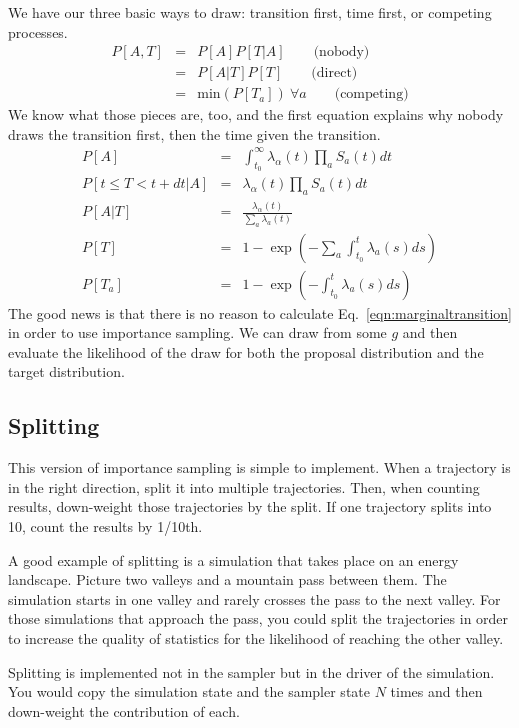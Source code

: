 \documentclass{article}
\begin{document}
We have our three basic ways to draw: transition first, time first, or competing processes.
\begin{eqnarray}
	P[A,T]&=&P[A]P[T|A]\qquad\mbox{(nobody)} \\
	&=&P[A|T]P[T]\qquad\mbox{(direct)}\\
	&=&\mbox{min}(P[T_a])\ \forall a\qquad\mbox{(competing)}
\end{eqnarray}
We know what those pieces are, too, and the first equation explains why nobody draws the transition first, then the time given the transition.
\begin{eqnarray}
	P[A] & = & \int_{t_0}^\infty \lambda_{\alpha}(t)\prod_{a}S_a(t)dt\label{eqn:marginaltransition} \\
	P[t\le T<t+dt|A] & = & \lambda_{\alpha}(t)\prod_{a}S_a(t)dt \\
	P[A|T] & = & \frac{\lambda_\alpha(t)}{\sum_a\lambda_a(t)} \\
	P[T] & = & 1-\exp(-\sum_a\int_{t_0}^t\lambda_a(s)ds) \\
	P[T_a] & = & 1-\exp(-\int_{t_0}^t \lambda_a(s)ds)
\end{eqnarray}
The good news is that there is no reason to calculate Eq.~\ref{eqn:marginaltransition} in order to use importance sampling. We can draw from some $g$ and then evaluate the likelihood of the draw for both the proposal distribution and the target distribution.


\subsection{Splitting}

This version of importance sampling is simple to implement. When a trajectory is in the right direction, split it into multiple trajectories. Then, when counting results, down-weight those trajectories by the split. If one trajectory splits into 10, count the results by 1/10th.

A good example of splitting is a simulation that takes place on an energy landscape. Picture two valleys and a mountain pass between them. The simulation starts in one valley and rarely crosses the pass to the next valley. For those simulations that approach the pass, you could split the trajectories in order to increase the quality of statistics for the likelihood of reaching the other valley.

Splitting is implemented not in the sampler but in the driver of the simulation. You would copy the simulation state and the sampler state $N$ times and then down-weight the contribution of each.
\end{document}
